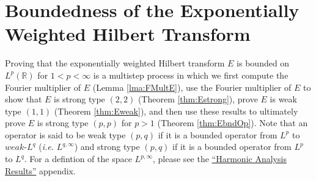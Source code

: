 \documentclass[../dissertation.tex]{subfiles}
\begin{document}
\section{Boundedness of the Exponentially Weighted Hilbert Transform}\label{sec3:BndE}

Proving that the exponentially weighted Hilbert transform $E$ is bounded on 
$L^p(\mathbb R)$ for $1< p < \infty$ is a multistep process in which we first compute
the Fourier multiplier of $E$ (Lemma \ref{lma:FMultE}), use the Fourier multiplier
of $E$ to show that $E$ is strong type $(2,2)$ (Theorem \ref{thm:Estrong}), prove $E$ is 
weak type $(1, 1)$ (Theorem \ref{thm:Eweak}), and then use these results to ultimately
prove $E$ is strong type $(p, p)$ for $p>1$ (Theorem \ref{thm:EbndOp}). Note that an 
operator is said to be weak type $(p,q)$ if it is a bounded operator from $L^p$ to 
$weak$-$L^q$ (\textit{i.e.} $L^{q, \infty}$) and strong type $(p,q)$ if it 
is a bounded operator from $L^p$ to $L^q$. For a defintion of the space
$L^{p,\infty}$, please see the \hyperref[app:HA]{``Harmonic Analysis Results''} 
appendix.
\end{document}
